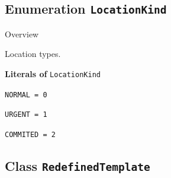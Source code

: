 \subsection{Enumeration \bfseries \texttt{LocationKind}\normalfont}
\label{cls:uppaal::templates::LocationKind} 

	\begin{longdescription}
		\item[Overview] 		
				

	

		Location types.		
	
		\item[\textbf{Literals of} \texttt{LocationKind}] ~
		\begin{longdescription}
			
\item[\texttt{NORMAL = 0}] ~
\nopagebreak

\item[\texttt{URGENT = 1}] ~
\nopagebreak

\item[\texttt{COMMITED = 2}] ~
\nopagebreak
		\end{longdescription}
	\end{longdescription}
	
	

\subsection{Class \bfseries \texttt{RedefinedTemplate}\normalfont}
\label{cls:uppaal::templates::RedefinedTemplate} 
	
